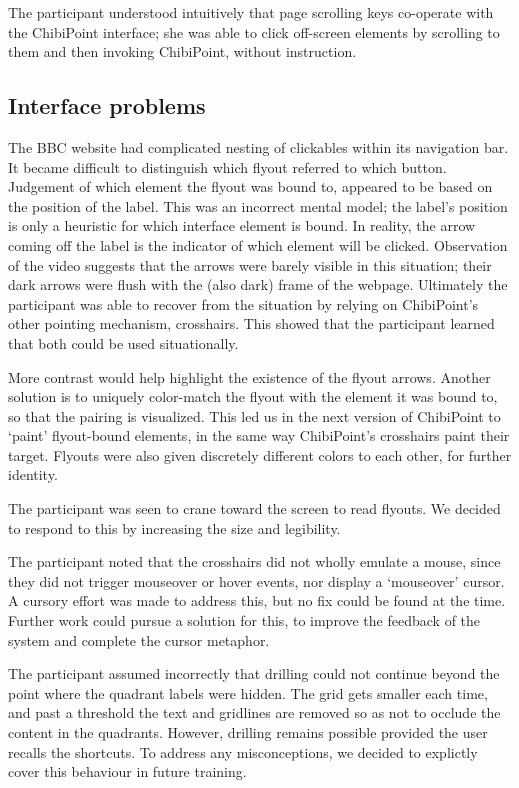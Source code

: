 \documentclass[a4paper, 12pt]{report}
\begin{document}
The participant understood intuitively that page scrolling keys co-operate with the ChibiPoint interface; she was able to click off-screen elements by scrolling to them and then invoking ChibiPoint, without instruction.

\subsection{Interface problems}
The BBC website had complicated nesting of clickables within its navigation bar. It became difficult to distinguish which flyout referred to which button. Judgement of which element the flyout was bound to, appeared to be based on the position of the label. This was an incorrect mental model; the label's position is only a heuristic for which interface element is bound. In reality, the arrow coming off the label is the indicator of which element will be clicked. Observation of the video suggests that the arrows were barely visible in this situation; their dark arrows were flush with the (also dark) frame of the webpage. Ultimately the participant was able to recover from the situation by relying on ChibiPoint's other pointing mechanism, crosshairs. This showed that the participant learned that both could be used situationally.

More contrast would help highlight the existence of the flyout arrows. Another solution is to uniquely color-match the flyout with the element it was bound to, so that the pairing is visualized. This led us in the next version of ChibiPoint to `paint' flyout-bound elements, in the same way ChibiPoint's crosshairs paint their target. Flyouts were also given discretely different colors to each other, for further identity.

The participant was seen to crane toward the screen to read flyouts. We decided to respond to this by increasing the size and legibility.

The participant noted that the crosshairs did not wholly emulate a mouse, since they did not trigger mouseover or hover events, nor display a `mouseover' cursor. A cursory effort was made to address this, but no fix could be found at the time. Further work could pursue a solution for this, to improve the feedback of the system and complete the cursor metaphor.

The participant assumed incorrectly that drilling could not continue beyond the point where the quadrant labels were hidden. The grid gets smaller each time, and past a threshold the text and gridlines are removed so as not to occlude the content in the quadrants. However, drilling remains possible provided the user recalls the shortcuts. To address any misconceptions, we decided to explictly cover this behaviour in future training.
\end{document}
